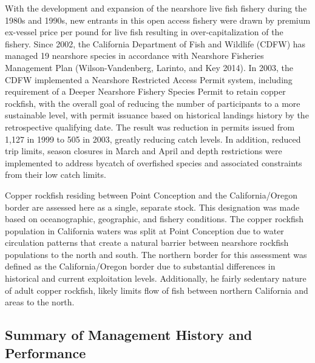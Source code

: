 \documentclass[11pt,
  english,
  a4paper,
]{article}
\begin{document}
With the development and expansion of the nearshore live fish fishery during the 1980s and 1990s, new entrants in this open access fishery were drawn by premium ex-vessel price per pound for live fish resulting in over-capitalization of the fishery. Since 2002, the California Department of Fish and Wildlife (CDFW) has managed 19 nearshore species in accordance with Nearshore Fisheries Management Plan {(Wilson-Vandenberg, Larinto, and Key 2014)\leavevmode\tagmcend\tagstructend}. In 2003, the CDFW implemented a Nearshore Restricted Access Permit system, including requirement of a Deeper Nearshore Fishery Species Permit to retain copper rockfish, with the overall goal of reducing the number of participants to a more sustainable level, with permit issuance based on historical landings history by the retrospective qualifying date. The result was reduction in permits issued from 1,127 in 1999 to 505 in 2003, greatly reducing catch levels. In addition, reduced trip limits, season closures in March and April and depth restrictions were implemented to address bycatch of overfished species and associated constraints from their low catch limits.

\leavevmode\tagmcend\tagstructend\par


Copper rockfish residing between Point Conception and the California/Oregon border are assessed here as a single, separate stock. This designation was made based on oceanographic, geographic, and fishery conditions. The copper rockfish population in California waters was split at Point Conception due to water circulation patterns that create a natural barrier between nearshore rockfish populations to the north and south. The northern border for this assessment was defined as the California/Oregon border due to substantial differences in historical and current exploitation levels. Additionally, he fairly sedentary nature of adult copper rockfish, likely limits flow of fish between northern California and areas to the north.

\leavevmode\tagmcend\tagstructend\par


\hypertarget{summary-of-management-history-and-performance}{%
\subsection{Summary of Management History and Performance}\label{summary-of-management-history-and-performance}}
\end{document}
